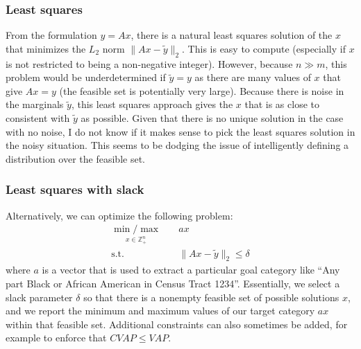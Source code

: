 \documentclass[12pt]{article}
\begin{document}
\subsubsection{Least squares}
From the formulation $y = Ax$, there is a natural least squares solution of the $x$ that minimizes the $L_2$ norm $\|Ax - \tilde{y}\|_2$. This is easy to compute (especially if $x$ is not restricted to being a non-negative integer). However, because $n \gg m$, this problem would be underdetermined if $\tilde{y} = y$ as there are many values of $x$ that give $Ax = y$ (the feasible set is potentially very large). Because there is noise in the marginals $\tilde{y}$, this least squares approach gives the $x$ that is as close to consistent with $\tilde{y}$ as possible. Given that there is no unique solution in the case with no noise, I do not know if it makes sense to pick the least squares solution in the noisy situation. This seems to be dodging the issue of intelligently defining a distribution over the feasible set.

\subsubsection{Least squares with slack}
Alternatively, we can optimize the following problem:
\begin{align*}
\underset{x \in \mathbb{Z}_+^n}{\min / \max} \quad & ax \\
\text{s.t.}\quad
& \|Ax - \tilde{y}\|_2 \leq \delta
\end{align*}
where $a$ is a vector that is used to extract a particular goal category like ``Any part Black or African American in Census Tract 1234''. Essentially, we select a slack parameter $\delta$ so that there is a nonempty feasible set of possible solutions $x$, and we report the minimum and maximum values of our target category $ax$ within that feasible set. Additional constraints can also sometimes be added, for example to enforce that $CVAP \leq VAP$.


\end{document}
